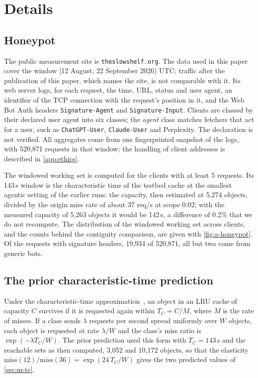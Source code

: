 \section{Details}\label{app:details}

\subsection{Honeypot}\label{app:honeypot}
The public measurement site is \texttt{theslowshelf.org}.
The data used in this paper cover the window [12 August, 22 September 2026) UTC; traffic
after the publication of this paper, which names the site, is not comparable with it.
Its web server logs, for each request, the time, URL,
status and user agent, an identifier of the TCP connection with the request's position in
it, and the Web Bot Auth headers \texttt{Signature-Agent} and
\texttt{Signature-Input}.
Clients are classed by their declared user agent into six classes; the \emph{agent} class
matches fetchers that act for a user, such as \texttt{ChatGPT-User}, \texttt{Claude-User}
and Perplexity.
The declaration is not verified.
All aggregates come from one fingerprinted snapshot of the logs, with 520,871 requests in
that window; the handling of client
addresses is described in \cref{app:ethics}.

The windowed working set is computed for the clients with at least 5 requests.
Its 143\,s window is the characteristic time of the testbed cache at the smallest agentic
setting of the earlier runs: the capacity, then estimated at 5,274 objects, divided by the
origin miss rate of about 37 req/s at scope 0.02; with the measured capacity of 5,263
objects it would be 142\,s, a difference of 0.2\% that we do not recompute.
The distribution of the windowed working set across clients, and the counts behind the
contiguity comparison, are given with \cref{fig:a-honeypot}.
Of the requests with signature headers, 19,934 of 520,871, all but two come from generic
bots.

\subsection{The prior characteristic-time prediction}\label{app:tc}
Under the characteristic-time approximation~\cite{fagin1977,che2002,fricker2012}, an object
in an LRU cache of capacity $C$ survives if it is requested again within
$T_C = C/M$, where $M$ is the rate of misses.
If a class sends $\lambda$ requests per second spread uniformly over $W$ objects, each
object is requested at rate $\lambda/W$ and the class's miss ratio is
$\exp(-\lambda T_C / W)$.
The prior prediction used this form with $T_C = 143$\,s and the reachable sets as then
computed, 3,052 and 10,172 objects, so that the elasticity
$\mathrm{miss}(12)/\mathrm{miss}(36) = \exp(24\,T_C/W)$ gives the two predicted values of
\cref{sec:m-tc}.
